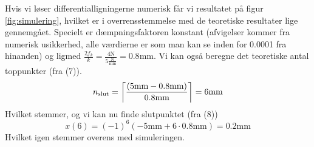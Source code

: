 Hvis vi løser differentialligningerne numerisk får vi resultatet på figur \ref{fig:simulering}, hvilket er i overrensstemmelse med de teoretiske resultater lige gennemgået. 
Specielt er dæmpningsfaktoren konstant (afvigelser kommer fra numerisk usikkerhed, alle værdierne er som man kan se inden for 0.0001 fra hinanden) og ligmed $\frac{2f_k}{k} = \frac{4 \text{N}}{5 \frac{\text{N}}{\text{mm}}} = 0.8 \text{mm}$.
Vi kan også beregne det teoretiske antal toppunkter (fra (7)). \[
    n_{\textup{slut}} = \left \lceil \frac{(5 \text{mm} - 0.8 \text{mm})}{0.8 \text{mm}} \right \rceil = 6 \text{mm}
\] 
Hvilket stemmer, og vi kan nu finde slutpunktet (fra (8))
\[
x(6) = (-1)^{6} (-5\text{mm} + 6 \cdot 0.8 \text{mm}) = 0.2 \text{mm}
\]
Hvilket igen stemmer overens med simuleringen.